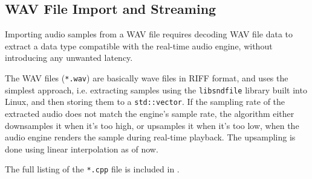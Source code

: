 \subsection{WAV File Import and Streaming}

Importing audio samples from a WAV file requires decoding WAV file data
to extract a data type compatible with the real-time audio engine,
without introducing any unwanted latency.

The WAV files (\texttt{*.wav}) are basically wave files in RIFF format,
and uses the simplest approach, i.e. extracting samples using the \texttt{libsndfile} \cite{libsndfile}
library built into Linux, and then storing them to a \texttt{std::vector}. If the 
sampling rate of the extracted audio does not match the engine's sample rate, 
the algorithm either downsamples it when it's too high, or upsamples it when it's too low,
when the audio engine renders the sample during real-time playback.
The upsampling is done using linear interpolation as of now.

The full listing of the \texttt{*.cpp} file is included in .